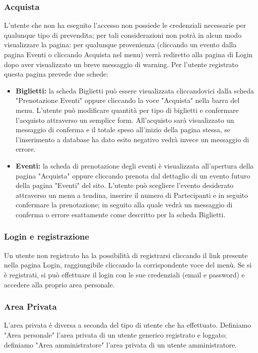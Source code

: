         \subsubsection{Acquista}
            L'utente che non ha eseguito l'accesso non possiede le credenziali necessarie per qualunque tipo di prevendita; per tali considerazioni non potrà in alcun modo visualizzare la pagina: per qualunque provenienza (cliccando un evento dalla pagina Eventi o cliccando Acquista nel menu) verrà rediretto alla pagina di Login dopo aver visualizzato un breve messaggio di warning.
            Per l'utente registrato questa pagina prevede due schede:
            \begin{itemize}
                \item \textbf{Biglietti:} la scheda Biglietti può essere visualizzata cliccandovici dalla scheda "Prenotazione Eventi" oppure cliccando la voce "Acquista" nella barra del menu. L'utente può modificare quantità per tipo di biglietti e confermare l'acquisto attraverso un semplice form. All'acquisto sarà visualizzato un messaggio di conferma e il totale speso all'inizio della pagina stessa, se l'inserimento a database ha dato esito negativo vedrà invece un messaggio di errore.
                \item \textbf{Eventi:} la scheda di prenotazione degli eventi è visualizzata all'apertura della pagina "Acquista" oppure cliccando prenota dal dettaglio di un evento futuro della pagina "Eventi" del sito. L'utente può scegliere l'evento desiderato attraverso un menu a tendina, inserire il numero di Partecipanti e in seguito confermare la prenotazione; in seguito alla quale vedrà un messaggio di conferma o errore esattamente come descritto per la scheda Biglietti.
            \end{itemize}
            \subsubsection{Login e registrazione}
            Un utente non registrato ha la possibilità di registrarsi cliccando il link presente nella pagina Login, raggiungibile cliccando la corrispondente voce del menù. Se si è registrati, si può effettuare il login con le sue credenziali (email e password) e accedere alla proprio area personale.
        \subsubsection{Area Privata}
            L'area privata è diversa a seconda del tipo di utente che ha effettuato. Definiamo "Area personale" l'area privata di un utente generico registrato e loggato; definiamo "Area amministratore" l'area privata di un utente amministratore.
